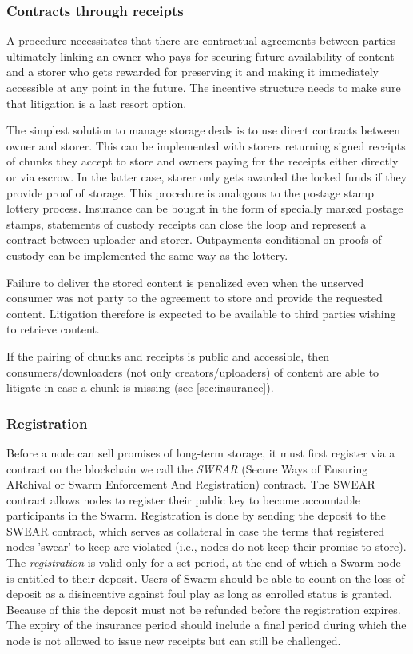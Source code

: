 \subsubsection{Contracts through receipts}

A  procedure necessitates that there are contractual agreements between parties ultimately linking an owner who pays for securing future availability of content and a storer who gets rewarded for preserving it and making it immediately accessible at any point in the future. The incentive structure needs to make sure that litigation is a last resort option.

The simplest solution to manage storage deals is to use direct contracts between owner and storer. This can be implemented with storers returning signed receipts of chunks they accept to store and owners paying for the receipts either directly or via escrow. In the latter case, storer only gets awarded the locked funds if they provide proof of storage. This procedure is analogous to the postage stamp lottery process. Insurance can be bought in the form of specially marked postage stamps,  statements of custody receipts can close the loop and represent a contract between uploader and storer. Outpayments conditional on proofs of custody can be implemented the same way as the lottery.

Failure to deliver the stored content is penalized even when the unserved consumer was not party to the agreement to store and provide the requested content. Litigation therefore is expected to be available to third parties wishing to retrieve content.

If the pairing of chunks and receipts is public and accessible, then consumers/downloaders (not only creators/uploaders) of content are able to litigate in case a chunk is missing (see \ref{sec:insurance}). 

\subsubsection{Registration}

Before a node can sell promises of long-term storage, it must first register via a contract on the blockchain we call the \emph{SWEAR} (Secure Ways of Ensuring ARchival or Swarm Enforcement And Registration) contract. The SWEAR contract allows nodes to register their public key to become accountable participants in the Swarm. Registration is done by sending the deposit to the SWEAR contract, which serves as collateral in case the terms that registered nodes 'swear' to keep are violated (i.e., nodes do not keep their promise to store). The \emph{registration} is valid only for a set period, at the end of which a Swarm node is entitled to their deposit. Users of Swarm should be able to count on the loss of deposit as a disincentive against foul play as long as enrolled status is granted. Because of this the deposit must not be refunded before the registration expires. The expiry of the insurance period should include a final period  during which the node is not allowed to issue new receipts but can still be challenged.


